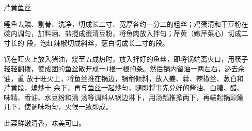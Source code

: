 \begin{recipe}{芹黄鱼丝}

\ingredients


\preparation

\step 鲤鱼去鱗、剔骨、洗净，切成长二寸、宽厚各约一分二的粗丝；鸡蛋清和干豆粉在
碗内调匀，加料酒、盐搅成蛋清豆粉，将鱼肉放入拌匀；芹黄（嫩芹菜心）切成二寸长的
段，泡红辣椒切成斜丝，葱白切成长二寸的段。

\step 锅在旺火上放入猪油，烧至五成热时，放入拌好的鱼丝，即将锅端离火口，用筷子
轻轻翻拨，使成团的鱼丝散开成一1根一根的条。然后锅内留油一两左右，泌去余油，重
放于旺火上，将鱼丝推在锅边，锅稍倾斜，放入姜、蒜、辣椒丝、葱白和芹黄段，煸炒十
余下，再与鱼丝一起炒匀，随即将事先兑好的酱油、白糖、醋、味精、香油、水豆粉和清
汤等调料从锅边淋下，用汤瓢推掀两下，再端起锅颠簸几下，使调味均匀，火候一致即成。

\features

此菜鲜嫩清香，味美可口。

\end{recipe}

